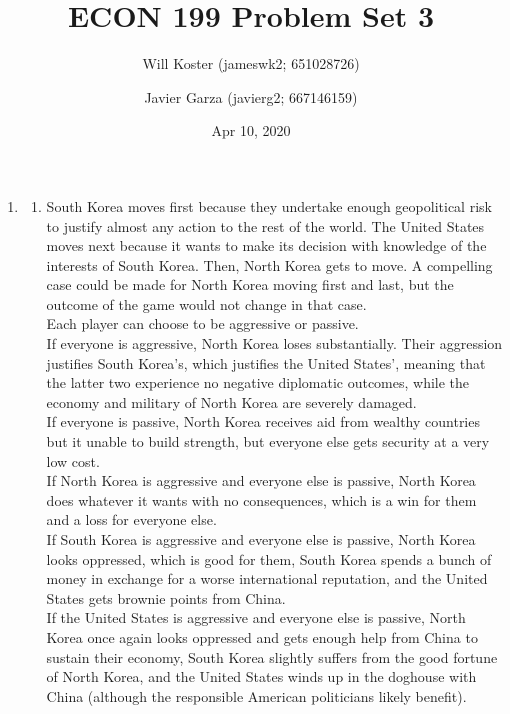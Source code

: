 \documentclass[letterpaper]{article}
\begin{document}
\title{ECON 199 Problem Set 3}
\author{Will Koster (jameswk2; 651028726) \and Javier Garza (javierg2; 667146159)}
\date{Apr 10, 2020}
\maketitle

\clearpage

\begin{enumerate}
    \item \begin{enumerate}
            \item South Korea moves first because they undertake enough geopolitical risk to justify almost any action to the rest of the world. The United States moves next because it wants to make its decision with knowledge of the interests of South Korea. Then, North Korea gets to move. A compelling case could be made for North Korea moving first and last, but the outcome of the game would not change in that case. \\ 
                Each player can choose to be aggressive or passive. \\
                If everyone is aggressive, North Korea loses substantially. Their aggression justifies South Korea's, which justifies the United States', meaning that the latter two experience no negative diplomatic outcomes, while the economy and military of North Korea are severely damaged. \\
                If everyone is passive, North Korea receives aid from wealthy countries but it unable to build strength, but everyone else gets security at a very low cost. \\
                If North Korea is aggressive and everyone else is passive, North Korea does whatever it wants with no consequences, which is a win for them and a loss for everyone else. \\
                If South Korea is aggressive and everyone else is passive, North Korea looks oppressed, which is good for them, South Korea spends a bunch of money in exchange for a worse international reputation, and the United States gets brownie points from China. \\
                If the United States is aggressive and everyone else is passive, North Korea once again looks oppressed and gets enough help from China to sustain their economy, South Korea slightly suffers from the good fortune of North Korea, and the United States winds up in the doghouse with China (although the responsible American politicians likely benefit). \\

\end{enumerate}
\end{enumerate}
\end{document}
